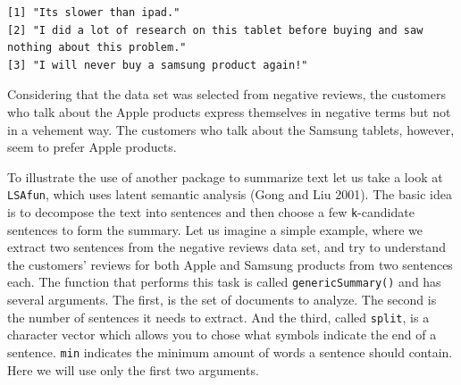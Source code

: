 \begin{verbatim}
[1] "Its slower than ipad."                                                                   
[2] "I did a lot of research on this tablet before buying and saw nothing about this problem."
[3] "I will never buy a samsung product again!"                                               
\end{verbatim}

Considering that the data set was selected from negative reviews, the
customers who talk about the Apple products express themselves in
negative terms but not in a vehement way. The customers who talk about
the Samsung tablets, however, seem to prefer Apple products.

To illustrate the use of another package to summarize text let us take a
look at \texttt{LSAfun}, which uses latent semantic analysis (Gong and Liu 2001). The basic idea is to decompose the text
into sentences and then choose a few \texttt{k}-candidate sentences to
form the summary. Let us imagine a simple example, where we extract two
sentences from the negative reviews data set, and try to understand the customers' reviews for
both Apple and Samsung products from two sentences each. The
function that performs this task is called \texttt{genericSummary()} and
has several arguments. The first, is the set of documents to analyze.
The second is the number of sentences it needs to extract. And the
third, called \texttt{split}, is a character vector which allows you to
chose what symbols indicate the end of a sentence. \texttt{min}
indicates the minimum amount of words a sentence should contain. Here we
will use only the first two arguments.

